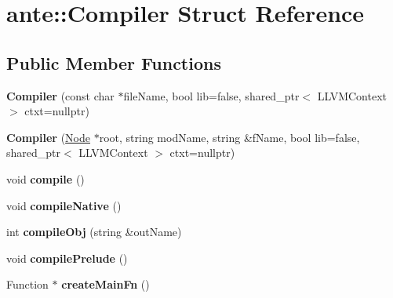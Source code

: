 \hypertarget{structante_1_1Compiler}{}\section{ante\+:\+:Compiler Struct Reference}
\label{structante_1_1Compiler}
\subsection*{Public Member Functions}
\begin{DoxyCompactItemize}
\item 
\mbox{\label{structante_1_1Compiler_a3eea249babcbd697bf5f9ac4d78c29f1}} 
{\bfseries Compiler} (const char $\ast$file\+Name, bool lib=false, shared\+\_\+ptr$<$ L\+L\+V\+M\+Context $>$ ctxt=nullptr)
\item 
\mbox{\label{structante_1_1Compiler_a030778900cf34d841a3249741d176e3d}} 
{\bfseries Compiler} (\hyperlink{structNode}{Node} $\ast$root, string mod\+Name, string \&f\+Name, bool lib=false, shared\+\_\+ptr$<$ L\+L\+V\+M\+Context $>$ ctxt=nullptr)
\item 
\mbox{\label{structante_1_1Compiler_a4eb6d2076006863fc52116489c7b4ec8}} 
void {\bfseries compile} ()
\item 
\mbox{\label{structante_1_1Compiler_a95e38823dc493732ccfb9e1fee804038}} 
void {\bfseries compile\+Native} ()
\item 
\mbox{\label{structante_1_1Compiler_adada529302d143f10dd26f0bc08b059f}} 
int {\bfseries compile\+Obj} (string \&out\+Name)
\item 
\mbox{\label{structante_1_1Compiler_a04558a0884c3f65f17fcc8e5f4d26144}} 
void {\bfseries compile\+Prelude} ()
\item 
\mbox{\label{structante_1_1Compiler_a32319f611aed8324441f50b440a90fce}} 
Function $\ast$ {\bfseries create\+Main\+Fn} ()
\item 
\mbox{\label{structante_1_1Compiler_a8aa516b2abbfb1697d3f06972c766ec4}} 

\end{DoxyCompactItemize}
